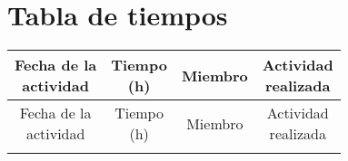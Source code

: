 \documentclass[12pt]{article}
\begin{document}
\section{Tabla de tiempos}

\begin{longtable}{|c|c|c|c|}
\hline
\makecell{Fecha de la \\ actividad} 
& \makecell{Tiempo \\ (h)} 
& Miembro 
& \makecell{Actividad \\ realizada} \\
\hline
\endfirsthead

\hline
\makecell{Fecha de la \\ actividad} 
& \makecell{Tiempo \\ (h)} 
& Miembro 
& \makecell{Actividad \\ realizada} \\
\hline
\endhead

\hline
\endfoot


\end{longtable}
\end{document}
